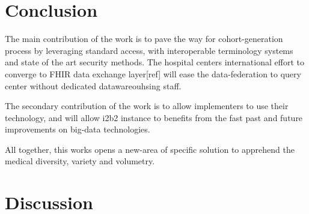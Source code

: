 \documentclass{amia}
\begin{document}
\section*{Conclusion} 

The main contribution of the work is to pave the way for cohort-generation process by leveraging standard access, with interoperable terminology systems and state of the art security methods. The hospital centers international effort to converge to FHIR data exchange layer[ref] will ease the data-federation to query center without dedicated datawareouhsing staff.

The secondary contribution of the work is to allow implementers to use their technology, and will allow i2b2 instance to benefits from the fast past and future improvements on big-data technologies.

All together, this works opens a new-area of specific solution to apprehend the medical diversity, variety and volumetry.

\section*{Discussion}
\end{document}

